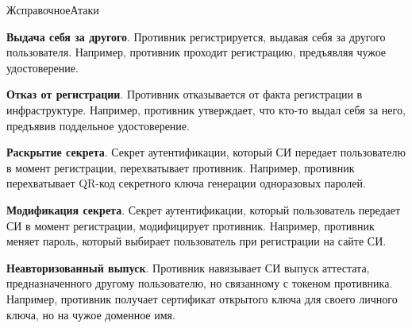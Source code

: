 \begin{appendix}{Ж}{справочное}{Атаки}\label{ATK}

\label{ATK.UR}

{\bf Выдача себя за другого}. 
Противник регистрируется, выдавая себя за другого пользователя.
Например, противник проходит регистрацию, предъявляя чужое удостоверение.  


{\bf Отказ от регистрации}. 
Противник отказывается от факта регистрации в инфраструктуре.
Например, противник утверждает, что кто-то выдал себя за него,
предъявив поддельное удостоверение.


{\bf Раскрытие секрета}. 
Секрет аутентификации, который СИ передает пользователю в момент 
регистрации, перехватывает противник. Например, противник перехватывает  
QR-код секретного ключа генерации одноразовых паролей.


{\bf Модификация секрета}. 
Секрет аутентификации, который пользователь передает СИ в момент 
регистрации, модифицирует противник.  
Например, противник меняет пароль, который выбирает пользователь при 
регистрации на сайте СИ. 


{\bf Неавторизованный выпуск}. 
Противник навязывает СИ выпуск аттестата, 
предназначенного другому пользователю, но связанному с токеном противника.
%
Например, противник получает сертификат открытого ключа 
для своего личного ключа, но на чужое доменное имя. 



\end{appendix}
